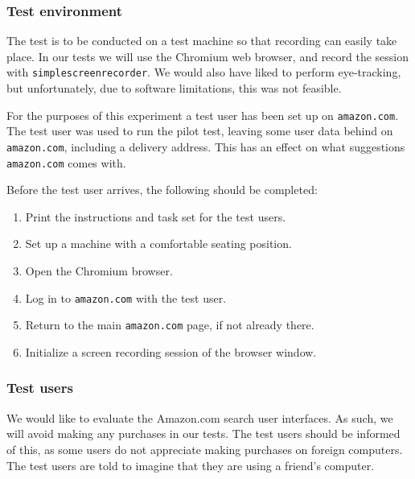 \subsubsection{Test environment}

The test is to be conducted on a test machine so that recording can easily take
place. In our tests we will use the Chromium web browser, and record the
session with \texttt{simplescreenrecorder}\footnotemark. We would also have
liked to perform eye-tracking, but unfortunately, due to software limitations,
this was not feasible.


For the purposes of this experiment a test user has been set up on
\texttt{amazon.com}. The test user was used to run the pilot test, leaving some
user data behind on \texttt{amazon.com}, including a delivery address. This has
an effect on what suggestions \texttt{amazon.com} comes with.

Before the test user arrives, the following should be completed:

\begin{enumerate}

\item Print the instructions and task set for the test users.

\item Set up a machine with a comfortable seating position.

\item Open the Chromium browser.

\item Log in to \texttt{amazon.com} with the test user.


\item Return to the main \texttt{amazon.com} page, if not already there.

\item Initialize a screen recording session of the browser window.

\end{enumerate}

\subsubsection{Test users}

We would like to evaluate the Amazon.com search user interfaces. As such, we
will avoid making any purchases in our tests. The test users should be informed
of this, as some users do not appreciate making purchases on foreign computers.
The test users are told to imagine that they are using a friend's computer.

